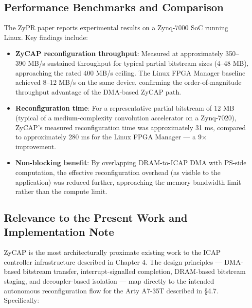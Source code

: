 \subsection{Performance Benchmarks and Comparison}

The ZyPR paper reports experimental results on a Zynq-7000 SoC running Linux. Key findings include:

\begin{itemize}
  \item \textbf{ZyCAP reconfiguration throughput}: Measured at approximately 350–390 MB/s sustained throughput for typical partial bitstream sizes (4–48 MB), approaching the rated 400 MB/s ceiling. The Linux FPGA Manager baseline achieved 8–12 MB/s on the same device, confirming the order-of-magnitude throughput advantage of the DMA-based ZyCAP path.
  \item \textbf{Reconfiguration time}: For a representative partial bitstream of 12 MB (typical of a medium-complexity convolution accelerator on a Zynq-7020), ZyCAP's measured reconfiguration time was approximately 31 ms, compared to approximately 280 ms for the Linux FPGA Manager — a 9× improvement.
  \item \textbf{Non-blocking benefit}: By overlapping DRAM-to-ICAP DMA with PS-side computation, the effective reconfiguration overhead (as visible to the application) was reduced further, approaching the memory bandwidth limit rather than the compute limit.
\end{itemize}
\subsection{Relevance to the Present Work and Implementation Note}

ZyCAP is the most architecturally proximate existing work to the ICAP controller infrastructure described in Chapter 4. The design principles — DMA-based bitstream transfer, interrupt-signalled completion, DRAM-based bitstream staging, and decoupler-based isolation — map directly to the intended autonomous reconfiguration flow for the Arty A7-35T described in §4.7. Specifically:

